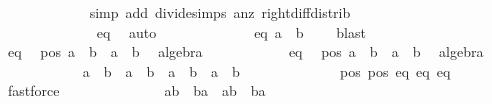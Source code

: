 \begin{isabellebody}
\ \ \ \ \ \ \ \ \ \ \ \ \isamarkupfalse%
{\isacharparenleft}simp\ add{\isacharcolon}\ divide{\isacharunderscore}simps\ a{}{\isacharunderscore}nz\ right{\isacharunderscore}diff{\isacharunderscore}distrib{\isacharprime}{\isacharparenright}\isanewline
\ \ \ \ \ \ \ \ \ \ \isamarkupfalse%
\ \isamarkupfalse%
\ {\isachardoublequoteopen}{\isachardot}{\isachardot}{\isachardot}\ {\isacharequal}\ {}{\isachardoublequoteclose}\ \isanewline
\ \ \ \ \ \ \ \ \ \ \ \ \isamarkupfalse%
\ eq{}\ \isamarkupfalse%
\ auto\isanewline
\ \ \ \ \ \ \ \ \ \ \isamarkupfalse%
\ \isamarkupfalse%
\ eq{}{\isacharcolon}\ {\isachardoublequoteopen}a{}{\isacharcircum}{}\ {\isacharminus}\ b{}{\isacharcircum}{}\ {\isacharequal}\ {}{\isachardoublequoteclose}\ \isamarkupfalse%
\ blast\isanewline
\ \ \ \ \isanewline
\ \ \ \ \ \ \ \ \ \ \isamarkupfalse%
\ eq{}\ \isamarkupfalse%
\ pos{}{\isacharcolon}\ {\isachardoublequoteopen}a{}\ {\isacharequal}\ b{}\ {\isasymor}\ a{}\ {\isacharequal}\ {\isacharminus}b{}{\isachardoublequoteclose}\ \isamarkupfalse%
\ algebra\isanewline
\ \ \ \ \ \ \ \ \ \ \isamarkupfalse%
\ eq{}\ \isamarkupfalse%
\ pos{}{\isacharcolon}\ {\isachardoublequoteopen}a{}\ {\isacharequal}\ b{}\ {\isasymor}\ a{}\ {\isacharequal}\ {\isacharminus}b{}{\isachardoublequoteclose}\ \isamarkupfalse%
\ algebra\isanewline
\ \ \ \ \ \ \ \ \ \ \isamarkupfalse%
\ {\isachardoublequoteopen}{\isacharparenleft}a{}\ {\isacharequal}\ b{}\ {\isasymand}\ a{}\ {\isacharequal}\ b{}{\isacharparenright}\ {\isasymor}\ {\isacharparenleft}a{}\ {\isacharequal}\ {\isacharminus}b{}\ {\isasymand}\ a{}\ {\isacharequal}\ {\isacharminus}b{}{\isacharparenright}{\isachardoublequoteclose}\isanewline
\ \ \ \ \ \ \ \ \ \ \ \ \isamarkupfalse%
\ pos{}\ pos{}\ eq{}\ eq{}\ eq{}{\isacharprime}\ \isamarkupfalse%
\ fastforce\ \isanewline
\ \ \ \ \ \ \ \ \ \ \isamarkupfalse%
\ \isamarkupfalse%
\ {\isachardoublequoteopen}{\isacharparenleft}a{}{\isacharcomma}b{}{\isacharparenright}\ {\isacharequal}\ {\isacharparenleft}b{}{\isacharcomma}a{}{\isacharparenright}\ {\isasymor}\ {\isacharparenleft}a{}{\isacharcomma}b{}{\isacharparenright}\ {\isacharequal}\ {\isacharparenleft}{\isacharminus}b{}{\isacharcomma}{\isacharminus}a{}{\isacharparenright}{\isachardoublequoteclose}\ \isamarkupfalse%

\end{isabellebody}
